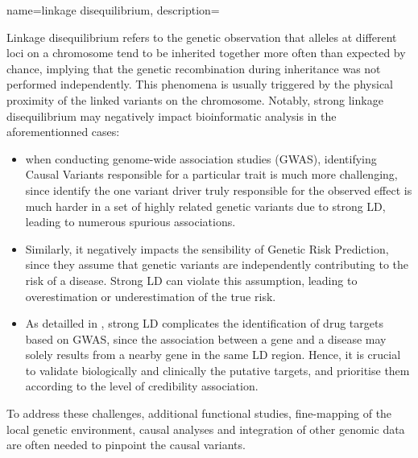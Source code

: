 {name=linkage disequilibrium, 
description={ Linkage disequilibrium refers to the genetic observation that alleles at different loci 
on a chromosome tend to be inherited together more often than expected by chance, implying that the genetic recombination 
during inheritance was not performed independently. This phenomena is usually triggered by the physical proximity of the linked variants
on the chromosome.
Notably, strong linkage disequilibrium may negatively impact bioinformatic analysis in the aforementionned cases:
\begin{itemize}
\item when conducting genome-wide association studies (GWAS), identifying Causal Variants responsible for 
a particular trait is much more challenging, since identify the one variant driver truly responsible for the observed effect
 is much harder in a set of highly related genetic variants due to strong LD, leading to numerous spurious associations.
 \item Similarly, it negatively impacts the sensibility of Genetic Risk Prediction, 
 since they assume that genetic variants are independently contributing to the risk of a disease. 
 Strong LD can violate this assumption, leading to overestimation or underestimation of the true risk.
 \item As detailled in , strong LD complicates the identification of drug targets based on GWAS,
 since the association between a gene and a disease may solely results from a nearby gene in the same LD region. Hence, it is crucial to
 validate biologically and clinically the putative targets, and prioritise them according to the level of credibility association.
\end{itemize}
To address these challenges, additional functional studies, fine-mapping of the local genetic environment, causal analyses and
 integration of other genomic data are often needed to pinpoint the causal variants.}
 } 
 
